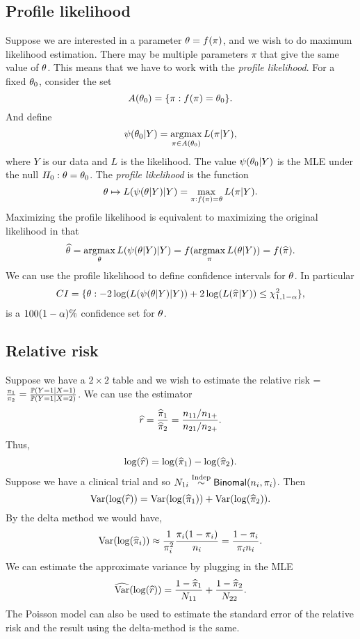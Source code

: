 \subsection{Profile likelihood}
Suppose we are interested in a parameter ${\theta} = f(\pi)$, and we wish to do maximum likelihood estimation. There may be multiple parameters $\pi$ that give the same value of ${\theta}$. This means that we have to work with the \emph{profile likelihood}. For a fixed ${\theta}_0$, consider the set 
\[A({\theta}_0) = \{ \pi : f(\pi)={\theta}_0\}.\]
And define 
\[\psi({\theta}_0|Y) = \operatorname*{argmax}_{\pi \in A({\theta}_0)} L(\pi|Y), \]
where $Y$ is our data and $L$ is the likelihood. The value $\psi({\theta}_0|Y)$ is the MLE under the null $H_0 : {\theta} = {\theta}_0$. The \emph{profile likelihood} is the function 
\[{\theta} \mapsto L(\psi({\theta} | Y)|Y) = \max_{\pi : f(\pi) = {\theta}} L(\pi | Y). \]
Maximizing the profile likelihood is equivalent to maximizing the original likelihood in that
\[\widehat{{\theta}} = \operatorname*{argmax}_{{\theta}} L(\psi({\theta}|Y)|Y) = f(\operatorname*{argmax}_\pi L({\theta}|Y))=f(\widehat{\pi}). \]
We can use the profile likelihood to define confidence intervals for ${\theta}$. In particular 
\[CI=\{{\theta} : -2\log(L(\psi({\theta}|Y)|Y)) +2\log(L(\widehat{\pi}|Y)) \le \chi^2_{1,1-{\alpha}}\}, \]
is a $100(1-{\alpha})\%$ confidence set for ${\theta}$.
\subsection{Relative risk}
Suppose we have a $2\times 2$ table and we wish to estimate the relative risk = $\frac{\pi_1}{\pi_2} = \frac{{\mathbb{P}}(Y=1|X=1)}{{\mathbb{P}}(Y=1|X=2)}$. We can use the estimator
\[\widehat{r} = \frac{\widehat{\pi}_1}{\widehat{\pi}_2} = \frac{n_{11}/n_{1+}}{n_{21}/n_{2+}}. \]
Thus,
\[ \log(\widehat{r}) = \log(\widehat{\pi}_1)-\log(\widehat{\pi}_2).\]
Suppose we have a clinical trial and so $N_{1i} \stackrel{\text{Indep}}{\sim} \mathsf{Binomal}(n_i,\pi_i)$. Then
\[\operatorname{Var}(\log(\widehat{r})) = \operatorname{Var}(\log(\widehat{\pi}_1))+\operatorname{Var}(\log(\widehat{\pi}_2)). \]
By the delta method we would have, 
\[\operatorname{Var}(\log(\widehat{\pi}_i)) \approx \frac{1}{\pi_i^2}\frac{\pi_i(1-\pi_i)}{n_i} = \frac{1-\pi_i}{\pi_i n_i}. \]
We can estimate the approximate variance by plugging in the MLE
\[\widehat{\operatorname{Var}}(\log(\widehat{r})) = \frac{1-\widehat{\pi}_1}{N_{11}}+\frac{1-\widehat{\pi}_2}{N_{22}}. \]
The Poisson model can also be used to estimate the standard error of the relative risk and the result using the delta-method is the same.
